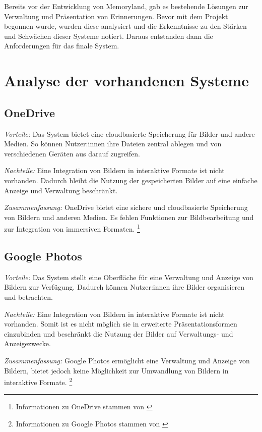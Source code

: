 Bereits vor der Entwicklung von Memoryland, gab es bestehende Lösungen zur Verwaltung
und Präsentation von Erinnerungen. Bevor mit dem Projekt begonnen wurde, wurden
diese analysiert und die Erkenntnisse zu den Stärken und Schwächen dieser Systeme
notiert. Daraus entstanden dann die Anforderungen für das finale System.

\section{Analyse der vorhandenen Systeme}

\subsection{OneDrive}

\emph{Vorteile:}
Das System bietet eine cloudbasierte Speicherung für Bilder und andere Medien. 
So können Nutzer:innen ihre Dateien zentral ablegen und von verschiedenen Geräten aus darauf 
zugreifen.

\emph{Nachteile:}
Eine Integration von Bildern in interaktive Formate ist nicht vorhanden. 
Dadurch bleibt die Nutzung der gespeicherten Bilder auf eine einfache 
Anzeige und Verwaltung beschränkt.

\emph{Zusammenfassung:}
OneDrive bietet eine sichere und cloudbasierte Speicherung von Bildern und anderen 
Medien. Es fehlen Funktionen zur Bildbearbeitung und zur Integration von 
immersiven Formaten. \footnote{Informationen zu OneDrive stammen von \cite{MicrosoftCorporation}}

\subsection{Google Photos}

\emph{Vorteile:}
Das System stellt eine Oberfläche für eine Verwaltung und Anzeige von Bildern 
zur Verfügung. Dadurch können Nutzer:innen ihre Bilder organisieren und betrachten.

\emph{Nachteile:}
Eine Integration von Bildern in interaktive Formate ist nicht vorhanden. 
Somit ist es nicht möglich sie in erweiterte Präsentationsformen einzubinden 
und beschränkt die Nutzung der Bilder auf Verwaltungs- und Anzeigezwecke.

\emph{Zusammenfassung:}
Google Photos ermöglicht eine Verwaltung und Anzeige von Bildern, bietet jedoch 
keine Möglichkeit zur Umwandlung von Bildern in interaktive Formate. \footnote{Informationen zu Google Photos stammen von \cite{GoogleIrelandLimited}}

